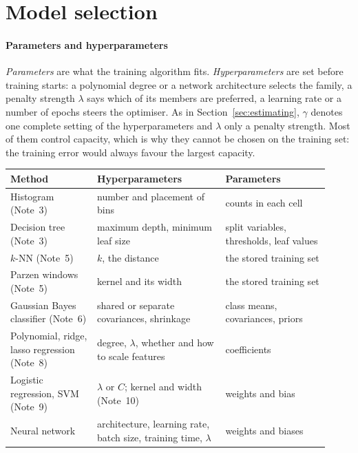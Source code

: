 \documentclass[11pt]{article}
\begin{document}
\section{Model selection}\label{sec:selection}

\paragraph{Parameters and hyperparameters} \emph{Parameters} are what the training algorithm fits.
\emph{Hyperparameters} are set before training starts: a polynomial degree or a network architecture selects the
family, a penalty strength $\lambda$ says which of its members are preferred, a learning rate or a number of epochs
steers the optimiser. As in Section~\ref{sec:estimating}, $\gamma$ denotes one complete setting of the
hyperparameters and $\lambda$ only a penalty strength. Most of them control capacity, which is why they cannot be chosen on the training set: the training
error would always favour the largest capacity.

\begin{center}\small
\begin{tabular}{@{}L{0.25\linewidth}L{0.37\linewidth}L{0.30\linewidth}@{}}
\toprule
Method & Hyperparameters & Parameters \\
\midrule
Histogram (Note~3) & number and placement of bins & counts in each cell \\
Decision tree (Note~3) & maximum depth, minimum leaf size & split variables, thresholds, leaf values \\
$k$-NN (Note~5) & $k$, the distance & the stored training set \\
Parzen windows (Note~5) & kernel and its width & the stored training set \\
Gaussian Bayes classifier (Note~6) & shared or separate covariances, shrinkage & class means, covariances, priors \\
Polynomial, ridge, lasso regression (Note~8) & degree, $\lambda$, whether and how to scale features & coefficients \\
Logistic regression, SVM (Note~9) & $\lambda$ or $C$; kernel and width (Note~10) & weights and bias \\
Neural network & architecture, learning rate, batch size, training time, $\lambda$ & weights and biases \\
\bottomrule
\end{tabular}
\end{center}
\end{document}
